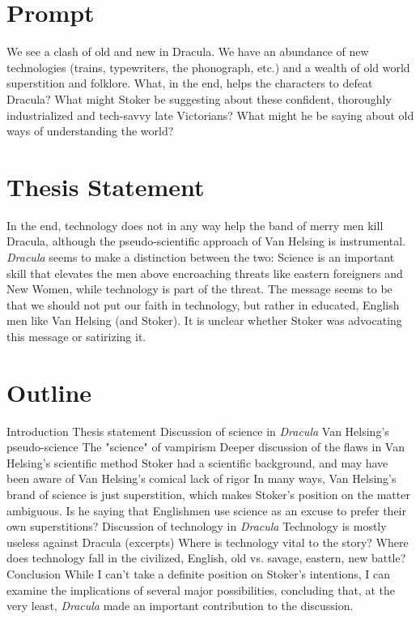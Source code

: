 \documentclass{article}
\begin{document}
\insertTitle

\section{Prompt}

We see a clash of old and new in Dracula. We have an abundance of new technologies (trains, typewriters, the phonograph, etc.) and a wealth of old world superstition and folklore. What, in the end, helps the characters to defeat Dracula? What might Stoker be suggesting about these confident, thoroughly industrialized and tech-savvy late Victorians? What might he be saying about old ways of understanding the world?

\section{Thesis Statement}

In the end, technology does not in any way help the band of merry men kill Dracula, although the pseudo-scientific approach of Van Helsing is instrumental. \textit{Dracula} seems to make a distinction between the two: Science is an important skill that elevates the men above encroaching threats like eastern foreigners and New Women, while technology is part of the threat. The message seems to be that we should not put our faith in technology, but rather in educated, English men like Van Helsing (and Stoker). It is unclear whether Stoker was advocating this message or satirizing it.

\section{Outline}
\begin{outline}[enumerate]
    \1 Introduction 
        \2 Thesis statement
    \1 Discussion of science in \textit{Dracula}
        \2 Van Helsing's pseudo-science
        \2 The "science" of vampirism
    \1 Deeper discussion of the flaws in Van Helsing's scientific method
        \2 Stoker had a scientific background, and may have been aware of Van Helsing's comical lack of rigor
        \2 In many ways, Van Helsing's brand of science is just superstition, which makes Stoker's position on the matter ambiguous. Is he saying that Englishmen use science as an excuse to prefer their own superstitions?
    \1 Discussion of technology in \textit{Dracula}
        \2 Technology is mostly useless against Dracula (excerpts)
        \2 Where is technology vital to the story?
        \2 Where does technology fall in the civilized, English, old vs. savage, eastern, new battle?
    \1 Conclusion
        \2 While I can't take a definite position on Stoker's intentions, I can examine the implications of several major possibilities, concluding that, at the very least, \textit{Dracula} made an important contribution to the discussion.
        
\end{outline}
\end{document}

